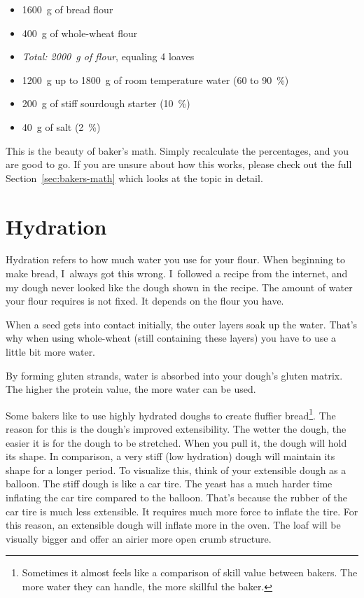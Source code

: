 \begin{itemize}
  \item \qty{1600}{\gram} of bread flour
  \item \qty{400}{\gram} of whole-wheat flour
  \item \emph{Total: 2000~g of flour}, equaling 4 loaves
  \item \qty{1200}{\gram} up to \qty{1800}{\gram} of room temperature water (60 to \qty{90}{\percent})
  \item \qty{200}{\gram} of stiff sourdough starter (\qty{10}{\percent})
  \item \qty{40}{\gram} of salt (\qty{2}{\percent})
\end{itemize}

This is the beauty of baker's math. Simply recalculate the percentages, and you
are good to go. If you are unsure about how this works, please check out the
full Section~\ref{sec:bakers-math} which looks at the topic in detail.

\section{Hydration}

Hydration refers to how much water you use for your flour. When
beginning to make bread, I~always got this wrong. I~followed a recipe from the
internet, and my dough never looked like the dough shown in the recipe.
The amount of water your flour requires is not fixed. It depends on the flour
you have.

When a seed gets into contact initially, the outer layers soak up the water.
That's why when using whole-wheat (still containing these layers) you have to
use a little bit more water.

By forming gluten strands, water is absorbed into your dough's gluten matrix.
The higher the protein value, the more water can be used.

Some bakers like to use highly hydrated doughs to create fluffier
bread\footnote{Sometimes it almost feels like a comparison of skill value
between bakers. The more water they can handle, the more skillful the baker.}.
The reason for this
is the dough's improved extensibility. The wetter the dough, the easier it is
for the dough to be stretched. When you pull it, the dough will hold its
shape. In comparison, a very stiff (low hydration) dough will maintain its
shape for a longer period. To visualize this, think of your extensible
dough as a balloon. The stiff dough is like a car tire.
The yeast has a much harder time inflating the car tire compared to the balloon.
That’s because the rubber of the car tire is much less extensible.
It requires much more force to inflate the tire. For this reason,
an extensible dough will inflate more in the oven. The loaf will
be visually bigger and offer an airier more open crumb structure.

